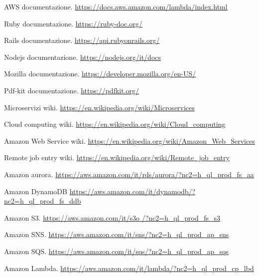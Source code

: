\documentclass[12pt]{article}
\begin{document}
\begin{thebibliography}{9}
  \bibitem{}
  AWS documentazione. 
  \url{https://docs.aws.amazon.com/lambda/index.html}

  \bibitem{}
  Ruby documentazione.
  \url{https://ruby-doc.org/}

  \bibitem{}
  Rails documentazione.
  \url{https://api.rubyonrails.org/}

  \bibitem{}
  Nodejs documentazione.
  \url{https://nodejs.org/it/docs}

  \bibitem{}
  Mozilla documentazione.
  \url{https://developer.mozilla.org/en-US/}

  \bibitem{}
  Pdf-kit documentazione.
  \url{https://pdfkit.org/}

  \bibitem{}
  Microservizi wiki.
  \url{https://en.wikipedia.org/wiki/Microservices}

  \bibitem{}
  Cloud computing wiki.
  \url{https://en.wikipedia.org/wiki/Cloud_computing}


  \bibitem{}
  Amazon Web Service wiki.
  \url{https://en.wikipedia.org/wiki/Amazon_Web_Services}

  \bibitem{}
  Remote job entry wiki.
  \url{https://en.wikipedia.org/wiki/Remote_job_entry}

  \bibitem{}
  Amazon aurora.
  \url{https://aws.amazon.com/it/rds/aurora/?nc2=h_ql_prod_fs_aa}

  \bibitem{}
  Amazon DynamoDB
  \url{https://aws.amazon.com/it/dynamodb/?nc2=h_ql_prod_fs_ddb}

  \bibitem{}
  Amazon S3.
  \url{https://aws.amazon.com/it/s3o /?nc2=h_ql_prod_fs_s3}

  \bibitem{}
  Amazon SNS.
  \url{https://aws.amazon.com/it/sns/?nc2=h_ql_prod_ap_sns}

  \bibitem{}
  Amazon SQS.
  \url{https://aws.amazon.com/it/sqs/?nc2=h_ql_prod_ap_sqs}

  \bibitem{}
  Amazon Lambda.
  \url{https://aws.amazon.com/it/lambda/?nc2=h_ql_prod_cp_lbd}

\end{thebibliography}
\end{document}
